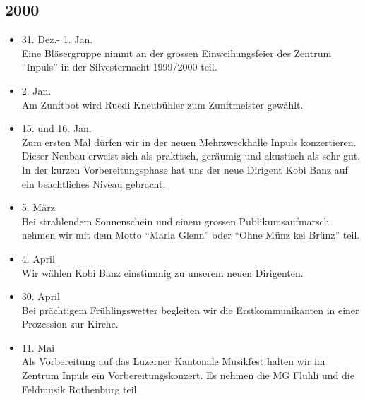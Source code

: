 \subsection*{2000}

\begin{history}


    \begin{itemize}

        \item 31. Dez.- 1. Jan.\\
              Eine Bläsergruppe nimmt an der grossen Einweihungsfeier des Zentrum
              \enquote{Inpuls} in der Silvesternacht 1999/2000 teil.

        \item 2. Jan.\\
              Am Zunftbot wird Ruedi Kneubühler zum Zunftmeister gewählt.

        \item 15. und 16. Jan.\\
              Zum ersten Mal dürfen wir in der neuen Mehrzweckhalle Inpuls
              konzertieren. Dieser Neubau erweist sich als praktisch, geräumig und
              akustisch als sehr gut. In der kurzen Vorbereitungsphase hat uns der
              neue Dirigent Kobi Banz auf ein beachtliches Niveau gebracht.

        \item 5. März\\
              Bei strahlendem Sonnenschein und einem grossen Publikumsaufmarsch nehmen
              wir mit dem Motto \enquote{Marla Glenn} oder \enquote{Ohne Münz kei
                  Brünz} teil.

        \item 4. April\\
              Wir wählen Kobi Banz einstimmig zu unserem neuen Dirigenten.

        \item 30. April\\
              Bei prächtigem Frühlingswetter begleiten wir die Erstkommunikanten in
              einer Prozession zur Kirche.

        \item 11. Mai\\
              Als Vorbereitung auf das Luzerner Kantonale Musikfest halten wir im
              Zentrum Inpuls ein Vorbereitungskonzert. Es nehmen die MG Flühli und die
              Feldmusik Rothenburg teil.


\end{itemize}
\end{history}
